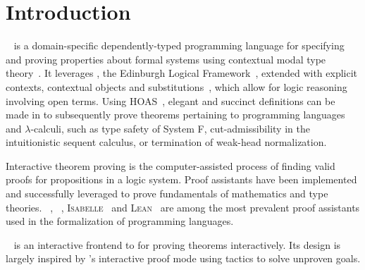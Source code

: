 \chapter{Introduction}





\Beluga~\cite{pientka2010beluga} is a domain-specific dependently-typed programming language for specifying and proving properties about formal systems using contextual modal type theory~\cite{nanevski2008contextual}.
It leverages \LF, the Edinburgh Logical Framework~\cite{harper1993framework}, extended with explicit contexts, contextual objects and substitutions~\cite{DBLP:journals/corr/abs-1009-2789, cave2013first}, which allow for logic reasoning involving open terms.
Using \ac{HOAS}~\cite{pfenning1988higher}, elegant and succinct definitions can be made in \LF to subsequently prove theorems pertaining to programming languages and $ \lambda $-calculi, such as type safety of System F, cut-admissibility in the intuitionistic sequent calculus, or termination of weak-head normalization.


Interactive theorem proving is the computer-assisted process of finding valid proofs for propositions in a logic system.
Proof assistants have been implemented and successfully leveraged to prove fundamentals of mathematics and type theories.
\Agda~\cite{clffolp}, \Coq~\cite{Coq, bertot2013interactive}, \textsc{Isabelle}~\cite{nipkow2002isabelle} and \textsc{Lean}~\cite{lean4} are among the most prevalent proof assistants used in the formalization of programming languages.

\Harpoon~\cite{errington2021harpoon} is an interactive frontend to \Beluga for proving theorems interactively.
Its design is largely inspired by \Coq's interactive proof mode using tactics to solve unproven goals.

